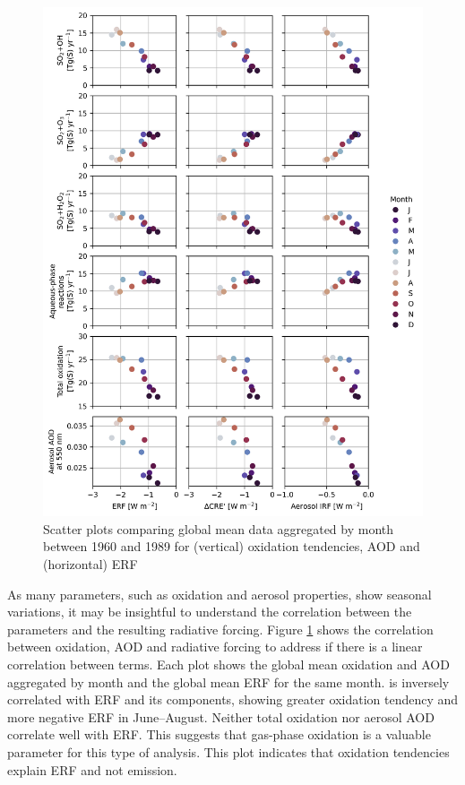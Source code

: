 \begin{figure}
    \centering
    \includegraphics[width=\linewidth]{Chapter4/Figs/seasonal_oxidation_erf_corr_pothole.png}
    \caption[Correlation between  oxidation tendencies and ERF between 1960 and 1989]{Scatter plots comparing global mean data aggregated by month between 1960 and 1989 for (vertical)  oxidation tendencies, AOD and (horizontal) ERF }
    \label{fig:ch4:seasonal-erf-corr}
\end{figure}

As many parameters, such as oxidation and aerosol properties, show seasonal variations, it may be insightful to understand the correlation between the parameters and the resulting radiative forcing. Figure \ref{fig:ch4:seasonal-erf-corr} shows the correlation between oxidation, AOD and radiative forcing to address if there is a linear correlation between terms. Each plot shows the global mean oxidation and AOD aggregated by month and the global mean ERF for the same month.  is inversely correlated with ERF and its components, showing greater oxidation tendency and more negative ERF in June--August. Neither total oxidation nor aerosol AOD correlate well with ERF. This suggests that gas-phase oxidation is a valuable parameter for this type of analysis. This plot indicates that oxidation tendencies explain ERF and not emission.


